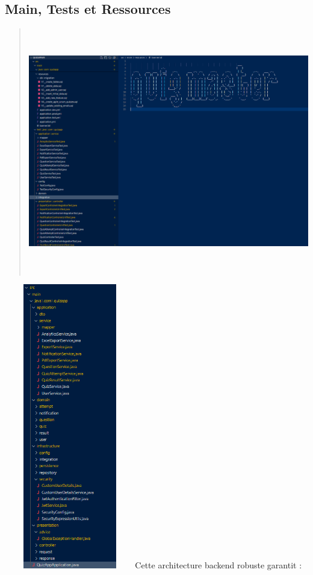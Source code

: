 \documentclass[12pt,a4paper,twoside]{report}
\begin{document}
\hypertarget{main-tests-et-ressources}{%
\subsection{Main, Tests et Ressources}\label{main-tests-et-ressources}}

\begin{quote}
\includegraphics[width=5.44097in,height=4.22361in]{latex_media/media/image46.png}
\end{quote}

\includegraphics[width=2.25347in,height=4.90556in]{latex_media/media/image47.png}Cette
architecture backend robuste garantit :
\end{document}
